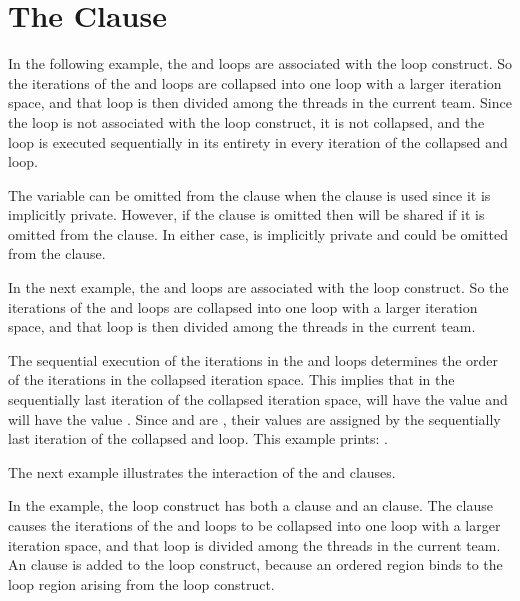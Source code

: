 \pagebreak
\section{The  Clause}
\label{sec:collapse}

In the following example, the  and  loops are associated with 
the loop construct. So the iterations of the  and  loops are 
collapsed into one loop with a larger iteration space, and that loop is then divided 
among the threads in the current team. Since the  loop is not associated 
with the loop construct, it is not collapsed, and the  loop is executed 
sequentially in its entirety in every iteration of the collapsed  and 
 loop. 

The variable  can be omitted from the   clause when the 
 clause is used since it is implicitly private. However, if the 
 clause is omitted then  will be shared if it is omitted 
from the  clause. In either case,  is implicitly private 
and could be omitted from the   clause.



In the next example, the  and  loops are associated with the 
loop construct. So the iterations of the  and  loops are collapsed 
into one loop with a larger iteration space, and that loop is then divided among 
the threads in the current team.

The sequential execution of the iterations in the  and  loops 
determines the order of the iterations in the collapsed iteration space. This implies 
that in the sequentially last iteration of the collapsed iteration space,  
will have the value  and  will have the value . Since 
 and  are , their values are assigned 
by the sequentially last iteration of the collapsed  and  loop. 
This example prints: .



The next example illustrates the interaction of the  and  
 clauses.

In the example, the loop construct has both a  clause and an  
clause. The  clause causes the iterations of the  and 
 loops to be collapsed into one loop with a larger iteration space, and 
that loop is divided among the threads in the current team. An  
clause is added to the loop construct, because an ordered region binds to the loop 
region arising from the loop construct.

